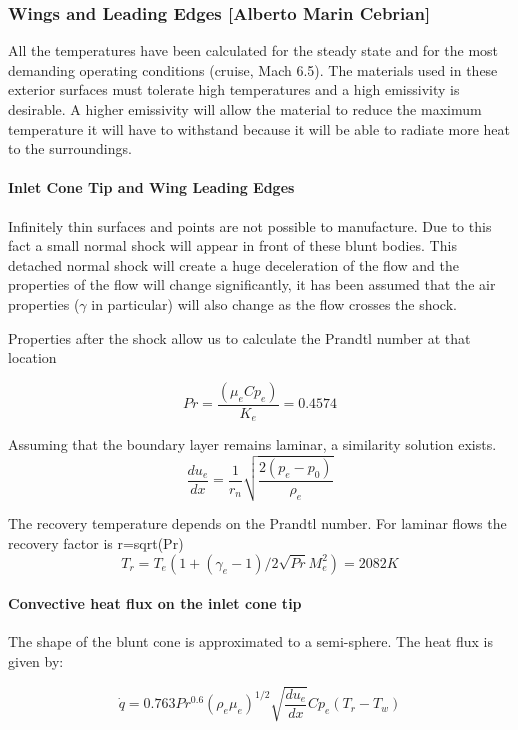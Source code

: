 \subsubsection{Wings and Leading Edges [Alberto Marin Cebrian]}
All the temperatures have been calculated for the steady state and for the most demanding operating conditions (cruise, Mach 6.5). The materials used in these exterior surfaces must tolerate high temperatures and a high emissivity is desirable. A higher emissivity will allow the material to reduce the maximum temperature it will have to withstand because it will be able to radiate more heat to the surroundings.

\paragraph{Inlet Cone Tip and Wing Leading Edges}
Infinitely thin surfaces and points are not possible to manufacture. Due to this fact a small normal shock will appear in front of these blunt bodies. This detached normal shock will create a huge deceleration of the flow and the properties of the flow will change significantly, it has been assumed that the air properties ($\gamma$ in particular) will also change as the flow crosses the shock.

Properties after the shock allow us to calculate the Prandtl number at that location

\begin{equation}
Pr=\frac{(\mu_e Cp_e)}{K_e} =0.4574
\end{equation}

Assuming that the boundary layer remains laminar, a similarity solution exists.
\begin{equation}
\frac{du_e}{dx}=\frac{1}{r_n}\sqrt{\frac{2(p_e-p_0)}{\rho_e}}
\end{equation}

The recovery temperature depends on the Prandtl number. For laminar flows the recovery factor is r=sqrt(Pr)
\begin{equation}
T_r=T_e (1+(\gamma_e-1)/2 \sqrt{Pr} M_e^2 )=2082 K
\end{equation}

\paragraph{Convective heat flux on the inlet cone tip}
The shape of the blunt cone is approximated to a semi-sphere. The heat flux is given by:

\begin{equation}
\dot{q}=0.763Pr^{0.6}(\rho_e\mu_e)^{1/2}\sqrt{\frac{du_e}{dx}}Cp_e(T_r-T_w)
\label{eqn:tipHeatFlux}
\end{equation}

